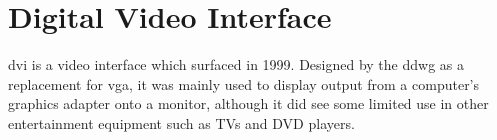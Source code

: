 \chapter{Digital Video Interface}
\gls{dvi} is a video interface which surfaced in 1999. Designed by the \gls{ddwg} as a replacement for \gls{vga}, it was mainly used to display output from a computer's graphics adapter onto a monitor, although it did see some limited use in other entertainment equipment such as TVs and DVD players.
